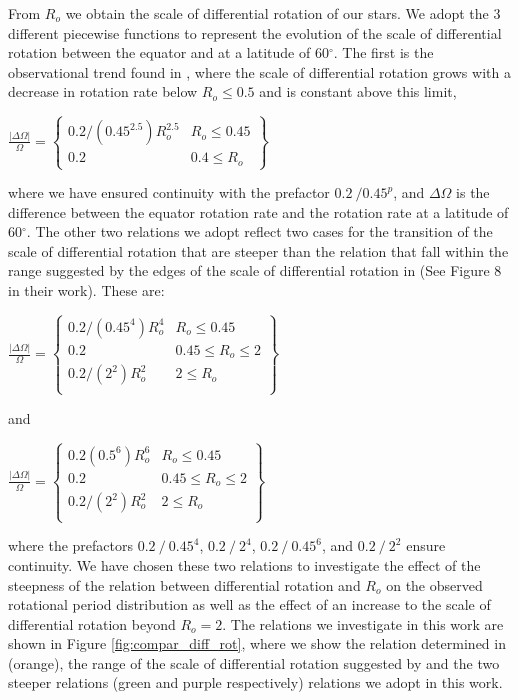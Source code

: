 From $R_o$ we obtain the scale of differential rotation of our stars.
We adopt the 3 different piecewise functions to represent the evolution of the scale of differential rotation between the equator and at a latitude of 60$^{\circ}$.
The first is the observational trend found in \citet{saar_starspots_2011}, where the scale of differential rotation grows with a decrease in rotation rate below $R_o\leq0.5$ and is constant above this limit,
{\centering
$\frac{|\Delta\Omega|}{\Omega} = \left\{
\begin{array}{ll}
   0.2/(0.45^{2.5}) R_o^{2.5}& R_o\leq 0.45 \\
   0.2 & 0.4 \leq R_o
\end{array} 
\right\}$\par}
where we have ensured continuity with the prefactor $0.2 \ / 0.45^{p}$, and $\Delta \Omega$ is the difference between the equator rotation rate and the rotation rate at a latitude of 60$^{\circ}$.
The other two relations we adopt reflect two cases for the transition of the scale of differential rotation that are steeper than the \citet{saar_starspots_2011} relation that fall within the range suggested by the edges of the scale of differential rotation in \citet{brun_powering_2022} (See Figure 8 in their work).
These are:
{\centering
$\frac{|\Delta\Omega|}{\Omega} = \left\{
\begin{array}{ll}
   0.2/(0.45^4) R_o^4& R_o\leq 0.45 \\
   0.2 & 0.45\leq R_o\leq 2 \\
   0.2/(2^2) R_o^2& 2\leq R_o \\
\end{array} 
\right\}$\par}

and

{\centering
$\frac{|\Delta\Omega|}{\Omega} =  \left\{
\begin{array}{ll}
   0.2(0.5^6) R_o^6& R_o\leq 0.45 \\
   0.2 & 0.45\leq R_o\leq 2 \\
   0.2/(2^2) R_o^2 & 2\leq R_o \\
\end{array} 
\right\}$\par}

where the prefactors $0.2 \ / \ 0.45^{4}$, $0.2 \ / \ 2^{4}$, $0.2 \ / \ 0.45^{6}$, and $0.2 \ / \ 2^{2}$ ensure continuity.
We have chosen these two relations to investigate the effect of the steepness of the relation between differential rotation and $R_o$ on the observed rotational period distribution as well as the effect of an increase to the scale of differential rotation beyond $R_o = 2$.
The relations we investigate in this work are shown in Figure \ref{fig:compar_diff_rot}, where we show the relation determined in \citet{saar_starspots_2011} (orange), the range of the scale of differential rotation suggested by \citet{brun_powering_2022} and the two steeper relations (green and purple respectively) relations we adopt in this work.

